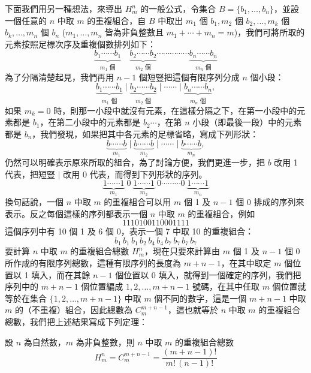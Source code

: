 下面我們用另一種想法，來導出 $H_m^n$ 的一般公式，令集合 $B = \{b_1, \ldots, b_n\}$，並設一個任意的 $n$ 中取 $m$ 的重複組合，自 $B$ 中取出 $m_1$ 個 $b_1, m_2$ 個 $b_2, \ldots, m_k$ 個 $b_k, \ldots, m_n$ 個 $b_n$ ($m_1, \ldots, m_n$ 皆為非負整數且 $m_1 + \cdots + m_n = m$)，我們可將所取的元素按照足標次序及重複個數排列如下：
\[
\underbrace{b_1 \cdots\cdots b_1}_{m_1 \text{ 個}} \quad \underbrace{b_2 \cdots\cdots b_2}_{m_2 \text{ 個}} \cdots\cdots\cdots\cdots\cdots \underbrace{b_n \cdots\cdots b_n}_{m_n \text{ 個}}
\]
為了分隔清楚起見，我們再用 $n-1$ 個短豎把這個有限序列分成 $n$ 個小段：
\[
\underbrace{b_1 \cdots\cdots b_1}_{m_1 \text{ 個}} \;\Big|\; \underbrace{b_2 \cdots\cdots b_2}_{m_2 \text{ 個}} \;\Big|\; \cdots\cdots \;\Big|\; \underbrace{b_n \cdots\cdots b_n}_{m_n \text{ 個}},
\]
如果 $m_k = 0$ 時，則那一小段中就沒有元素，在這樣分隔之下，在第一小段中的元素都是 $b_1$，在第二小段中的元素都是 $b_2 \cdots$，在第 $n$ 小段（即最後一段）中的元素都是 $b_n$，我們發現，如果把其中各元素的足標省略，寫成下列形狀：
\[
\underbrace{b \cdots\cdots b}_{m_1} \;\Big|\; \underbrace{b \cdots\cdots b}_{m_2} \;\Big|\; \cdots\cdots \;\Big|\; \underbrace{b \cdots\cdots b}_{m_n},
\]
仍然可以明確表示原來所取的組合，為了討論方便，我們更進一步，把 $b$ 改用 1 代表，把短豎 $\mid$ 改用 0 代表，而得到下列形狀的序列。
\[
\underbrace{1 \cdots\cdots 1}_{m_1} \;0\; \underbrace{1 \cdots\cdots 1}_{m_2} \;0 \cdots\cdots\cdots 0\; \underbrace{1 \cdots\cdots 1}_{m_n}
\]
換句話說，一個 $n$ 中取 $m$ 的重複組合可以用 $m$ 個 1 及 $n-1$ 個 0 排成的序列來表示。反之每個這樣的序列都表示一個 $n$ 中取 $m$ 的重複組合，例如
\[
1110100110001111
\]
這個序列中有 10 個 1 及 6 個 0，表示一個 7 中取 10 的重複組合：
\[
b_1\, b_1\, b_1\, b_2\, b_4\, b_4\, b_7\, b_7\, b_7\, b_7
\]
要計算 $n$ 中取 $m$ 的重複組合總數 $H_m^n$，現在只要來計算由 $m$ 個 1 及 $n-1$ 個 0 所作成的有限序列總數，這種有限序列的長度為 $m+n-1$，在其中取定 $m$ 個位置以 1 填入，而在其餘 $n-1$ 個位置以 0 填入，就得到一個確定的序列，我們把序列中的 $m+n-1$ 個位置編成 $1, 2, \ldots, m+n-1$ 號碼，在其中任取 $m$ 個位置就等於在集合 $\{1, 2, \ldots, m+n-1\}$ 中取 $m$ 個不同的數字，這是一個 $m+n-1$ 中取 $m$ 的（不重複）組合，因此總數為 $C_m^{m+n-1}$，這也就等於 $n$ 中取 $m$ 的重複組合總數，我們把上述結果寫成下列定理：

\medskip
\begin{theorem}\label{thm:b5-2-9}
設 $n$ 為自然數，$m$ 為非負整數，則 $n$ 中取 $m$ 的重複組合總數
\begin{equation*}
H_m^n = C_m^{m+n-1} = \frac{(m+n-1)!}{m!\, (n-1)!}
\end{equation*}
\end{theorem}


